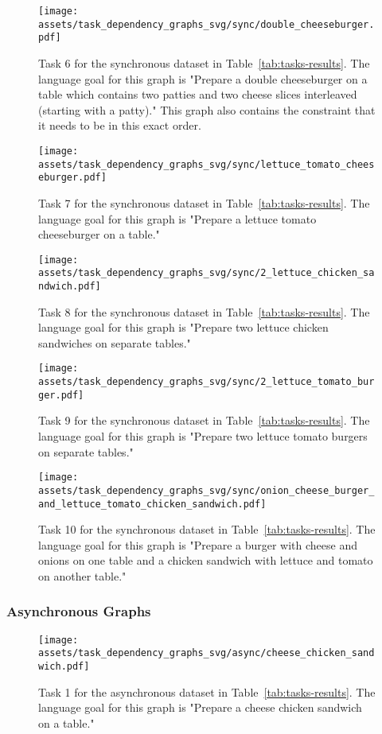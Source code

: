 \begin{figure}[H]
    \centering
    \texttt{[image: assets/task\_dependency\_graphs\_svg/sync/double\_cheeseburger.pdf]}
    \caption{Task 6 for the synchronous dataset in Table~\ref{tab:tasks-results}. The language goal for this graph is "Prepare a double cheeseburger on a table which contains two patties and two cheese slices interleaved (starting with a patty)." This graph also contains the constraint that it needs to be in this exact order.}
    \label{fig:5_sync}
\end{figure}

\begin{figure}[H]
    \centering
    \texttt{[image: assets/task\_dependency\_graphs\_svg/sync/lettuce\_tomato\_cheeseburger.pdf]}
    \caption{Task 7 for the synchronous dataset in Table~\ref{tab:tasks-results}. The language goal for this graph is "Prepare a lettuce tomato cheeseburger on a table."}
    \label{fig:6_sync}
\end{figure}

\begin{figure}[H]
    \centering
    \texttt{[image: assets/task\_dependency\_graphs\_svg/sync/2\_lettuce\_chicken\_sandwich.pdf]}
    \caption{Task 8 for the synchronous dataset in Table~\ref{tab:tasks-results}. The language goal for this graph is "Prepare two lettuce chicken sandwiches on separate tables."}
    \label{fig:7_sync}
\end{figure}

\begin{figure}[H]
    \centering
    \texttt{[image: assets/task\_dependency\_graphs\_svg/sync/2\_lettuce\_tomato\_burger.pdf]}
    \caption{Task 9 for the synchronous dataset in Table~\ref{tab:tasks-results}. The language goal for this graph is "Prepare two lettuce tomato burgers on separate tables."}
    \label{fig:8_sync}
\end{figure}

\begin{figure}[H]
    \centering
    \texttt{[image: assets/task\_dependency\_graphs\_svg/sync/onion\_cheese\_burger\_and\_lettuce\_tomato\_chicken\_sandwich.pdf]}
    \caption{Task 10 for the synchronous dataset in Table~\ref{tab:tasks-results}. The language goal for this graph is "Prepare a burger with cheese and onions on one table and a chicken sandwich with lettuce and tomato on another table."}
    \label{fig:9_sync}
\end{figure}

\subsubsection{Asynchronous Graphs}
\begin{figure}[H]
    \centering
    \texttt{[image: assets/task\_dependency\_graphs\_svg/async/cheese\_chicken\_sandwich.pdf]}
    \caption{Task 1 for the asynchronous dataset in Table~\ref{tab:tasks-results}. The language goal for this graph is "Prepare a cheese chicken sandwich on a table."}
    \label{fig:0_async}
\end{figure}

